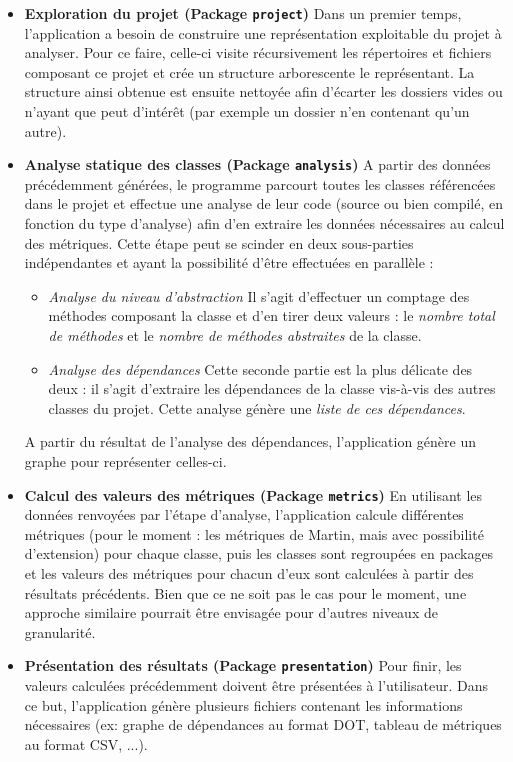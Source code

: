 \documentclass{scrartcl}
\begin{document}
    \begin{itemize}
        \bigbreak 
        \item[] \textbf{Exploration du projet (Package \texttt{project})} Dans un premier temps, l'application a besoin de construire une représentation exploitable du projet à analyser. Pour ce faire, celle-ci visite récursivement les répertoires et fichiers composant ce projet et crée un structure arborescente le représentant. La structure ainsi obtenue est ensuite nettoyée afin d'écarter les dossiers vides ou n'ayant que peut d'intérêt (par exemple un dossier n'en contenant qu'un autre).

        \bigbreak 
        \item[] \textbf{Analyse statique des classes (Package \texttt{analysis})} A partir des données précédemment générées, le programme parcourt toutes les classes référencées dans le projet et effectue une analyse de leur code (source ou bien compilé, en fonction du type d'analyse) afin d'en extraire les données nécessaires au calcul des métriques. Cette étape peut se scinder en deux sous-parties indépendantes et ayant la possibilité d'être effectuées en parallèle :
    	\begin{itemize}
    		\item \textit{Analyse du niveau d'abstraction} Il s'agit d'effectuer un comptage des méthodes composant la classe et d'en tirer deux valeurs : le \emph{nombre total de méthodes} et le \emph{nombre de méthodes abstraites} de la classe.
    		\item \textit{Analyse des dépendances} Cette seconde partie est la plus délicate des deux : il s'agit d'extraire les dépendances de la classe vis-à-vis des autres classes du projet. Cette analyse génère une \emph{liste de ces dépendances}.
    	\end{itemize}
	    A partir du résultat de l'analyse des dépendances, l'application génère un graphe pour représenter celles-ci.
	
	    \bigbreak 
	    \item[] \textbf{Calcul des valeurs des métriques (Package \texttt{metrics})} En utilisant les données renvoyées par l'étape d'analyse, l'application calcule différentes métriques (pour le moment : les métriques de Martin, mais avec possibilité d'extension) pour chaque classe, puis les classes sont regroupées en packages et les valeurs des métriques pour chacun d'eux sont calculées à partir des résultats précédents. Bien que ce ne soit pas le cas pour le moment, une approche similaire pourrait être envisagée pour d'autres niveaux de granularité.
	
	    \bigbreak 
	    \item[] \textbf{Présentation des résultats (Package \texttt{presentation})} Pour finir, les valeurs calculées précédemment doivent être présentées à l'utilisateur. Dans ce but, l'application génère plusieurs fichiers contenant les informations nécessaires (ex: graphe de dépendances au format DOT, tableau de métriques au format CSV, ...).
	
	\end{itemize}
\end{document}
